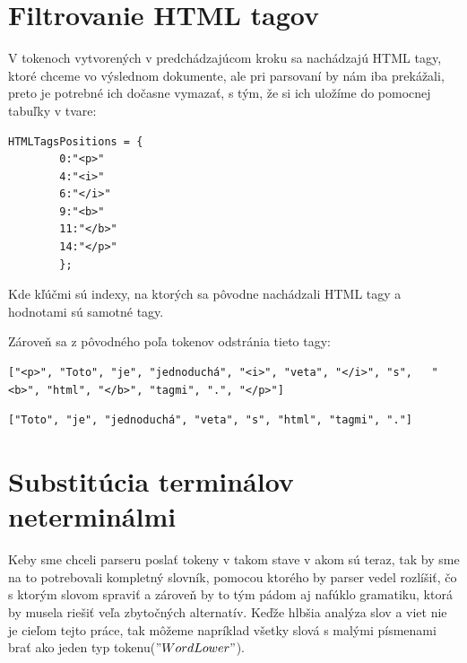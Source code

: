 \documentclass[12pt,a4paper]{report}
\theoremstyle{definition}
\theoremstyle{remark}
\begin{document}
\section{Filtrovanie HTML tagov}
V tokenoch vytvorených v predchádzajúcom kroku sa nachádzajú HTML tagy, ktoré chceme vo výslednom dokumente, ale pri parsovaní by nám iba prekážali, preto je potrebné ich dočasne vymazať, s tým, že si ich uložíme do pomocnej tabuľky v tvare:\\
\begin{lstlisting}[caption={Tabuľka HTML tagov}, style=htmlcssjs]
HTMLTagsPositions = {
		0:"<p>"
		4:"<i>"
		6:"</i>"
		9:"<b>"
		11:"</b>"
		14:"</p>"
		};
\end{lstlisting}

\noindent Kde kľúčmi sú indexy, na ktorých sa pôvodne nachádzali HTML tagy a hodnotami sú samotné tagy.

Zároveň sa z pôvodného poľa tokenov odstránia tieto tagy:
\begin{lstlisting}[caption={Text pred odstránením tagov}, style=htmlcssjs]
["<p>", "Toto", "je", "jednoduchá", "<i>", "veta", "</i>", "s",   "<b>", "html", "</b>", "tagmi", ".", "</p>"]
\end{lstlisting}
\begin{lstlisting}[caption={Text po odstránení tagov}, style=htmlcssjs]
["Toto", "je", "jednoduchá", "veta", "s", "html", "tagmi", "."]
\end{lstlisting}

\section{Substitúcia terminálov neterminálmi}
Keby sme chceli parseru poslať tokeny v takom stave v akom sú teraz, tak by sme na to potrebovali kompletný slovník, pomocou ktorého by parser vedel rozlíšiť, čo s ktorým slovom spraviť a zároveň by to tým pádom aj nafúklo gramatiku, ktorá by musela riešiť veľa zbytočných alternatív. Keďže hlbšia analýza slov a viet nie je cieľom tejto práce, tak  môžeme napríklad všetky slová s malými písmenami brať ako jeden typ tokenu($"WordLower"$).
\end{document}
